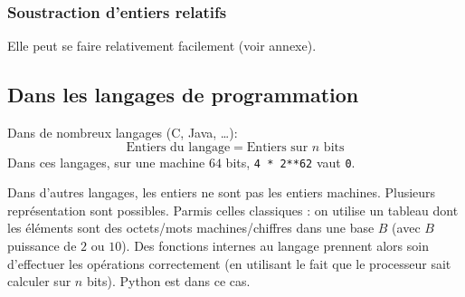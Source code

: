 %

\subsubsection{Soustraction d'entiers relatifs}

Elle peut se faire relativement facilement (voir annexe).



\subsection{Dans les langages de programmation}

Dans de nombreux langages (C, Java, \ldots):
\begin{equation*}
  \text{Entiers du langage} = \text{Entiers sur $n$ bits}
\end{equation*}
Dans ces langages, sur une machine $64$ bits,
\texttt{4 * 2**62} vaut \texttt{0}.

Dans d'autres langages, les entiers ne sont pas les entiers machines. Plusieurs
  représentation sont possibles. Parmis celles classiques : on utilise un tableau dont les
  éléments sont des octets/mots machines/chiffres dans une base $B$  (avec $B$ puissance de $2$ ou $10$).
 Des fonctions internes  au langage prennent alors soin d'effectuer les
  opérations correctement (en utilisant le fait que le processeur sait
  calculer sur $n$ bits). Python est dans ce cas.

